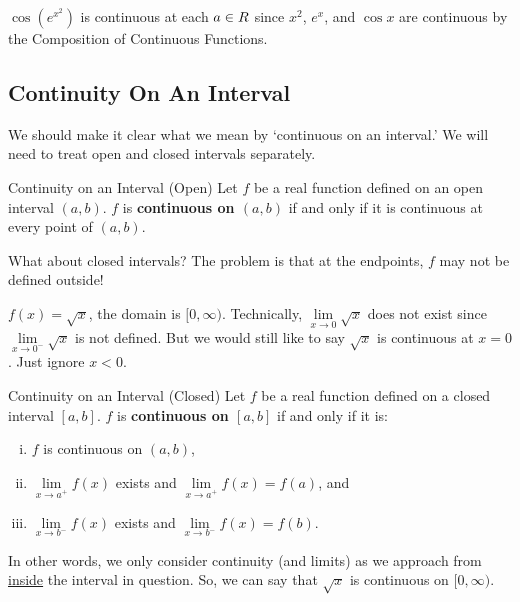 \begin{Example}{}{}
    $ \cos(e^{x^2}) $ is continuous at each $ a\in\relax{R} $ since $ x^2 $, $ e^x $, and $ \cos x $ are continuous by the Composition of Continuous Functions.
\end{Example}
\subsection{Continuity On An Interval}
We should make it clear what we mean by `continuous on an interval.'
We will need to treat open and closed intervals separately.
\begin{Definition}{Continuity on an Interval (Open)}{}
    Let $ f $ be a real function defined on an open interval $ (a,b) $.
    $ f $ is \textbf{continuous on $ (a,b) $} if and only if it is
    continuous at every point of $ (a,b) $.
\end{Definition}
What about closed intervals? The problem is that at the endpoints, $ f $ may not be defined outside!
\begin{Example}{}{}
    $ f(x)=\sqrt{x} $, the domain is $ [0,\infty) $. Technically, $ \lim\limits_{{x} \to {0}}\sqrt{x} $ does not exist
    since $ \lim\limits_{{x} \to {0^-}}\sqrt{x} $ is not defined. But we would still like to say $ \sqrt{x} $
    is continuous at $ x=0 $. Just ignore $ x<0 $.
\end{Example}
\begin{Definition}{Continuity on an Interval (Closed)}{}
    Let $ f $ be a real function defined on a closed interval $ [a,b] $.
    $ f $ is \textbf{continuous on $ [a,b] $} if and only if it is:
    \begin{enumerate}[(i)]
        \item $ f $ is continuous on $ (a,b) $,
        \item $ \lim\limits_{{x} \to {a^+}}f(x) $ exists and $\lim\limits_{{x} \to {a^+}}f(x)=f(a) $, and
        \item $ \lim\limits_{{x} \to {b^-}}f(x) $ exists and $\lim\limits_{{x} \to {b^-}}f(x)=f(b) $.
    \end{enumerate}
\end{Definition}
In other words, we only consider continuity (and limits) as we approach from \underline{inside} the interval in question. So,
we can say that $ \sqrt{x} $ is continuous on $ [0,\infty) $.